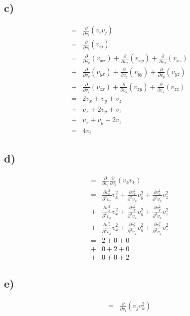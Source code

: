 \documentclass[paper=a4, fontsize=12pt]{scrartcl}
\begin{document}
\subsection*{c)}
\begin{align*}
=&\frac{\partial}{\partial v_i}(v_i v_j)\\
= &\frac{\partial}{\partial v_i}(v_{ij})\\
=&
 \frac{\partial}{\partial v_x}(v_{xx})
+\frac{\partial}{\partial v_x}(v_{xy})
+\frac{\partial}{\partial v_x}(v_{xz})\\
+& 
 \frac{\partial}{\partial v_y}(v_{yx})
+\frac{\partial}{\partial v_y}(v_{yy})
+\frac{\partial}{\partial v_y}(v_{yz})\\
+& 
 \frac{\partial}{\partial v_z}(v_{zx})
+\frac{\partial}{\partial v_z}(v_{zy})
+\frac{\partial}{\partial v_z}(v_{zz})\\
=& 
	2v_x + v_y + v_z\\
+&	v_x + 2v_y + v_z\\
+& 	v_x + v_y + 2v_z \\
=& 4v_i
\end{align*}

\subsection*{d)}
\begin{align*}
=&
\frac{\partial}{\partial v_i} \frac{\partial}{\partial v_i}(v_k v_k)\\
=& 
  \frac{\partial v^2_x}{\partial ^2 v_x}  v_x^2
+ \frac{\partial v^2_x}{\partial ^2 v_x}  v_y^2
+ \frac{\partial v^2_x}{\partial ^2 v_x}  v_z^2\\
+& 
  \frac{\partial v^2_y}{\partial ^2 v_x}  v_x^2
+ \frac{\partial v^2_y}{\partial ^2 v_x}  v_y^2
+ \frac{\partial v^2_y}{\partial ^2 v_x}  v_z^2\\
+&
  \frac{\partial v^2_z}{\partial ^2 v_x}  v_x^2
+ \frac{\partial v^2_z}{\partial ^2 v_x}  v_y^2
+ \frac{\partial v^2_z}{\partial ^2 v_x}  v_z^2\\
=& 
2 + 0 + 0 \\
+& 0 + 2 + 0\\
+& 0 + 0 + 2
\end{align*}

\subsection*{e)}
\begin{align*}
=& \frac{\partial}{\partial v_i}(v_j v_k^2)\\
\end{align*}
\end{document}
